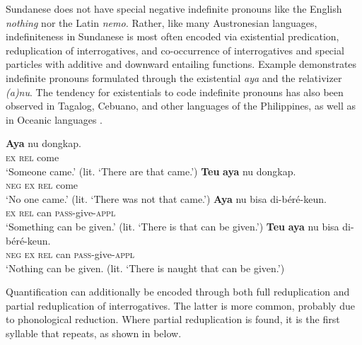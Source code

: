\documentclass[output=paper]{langscibook}
\begin{document}
Sundanese does not have special negative indefinite pronouns like the English \textit{nothing} nor the Latin \textit{nemo.} Rather, like many Austronesian languages, indefiniteness in Sundanese is most often encoded via existential predication, reduplication of interrogatives, and co-occurrence of interrogatives and special particles with additive and downward entailing functions. Example  demonstrates indefinite pronouns formulated through the existential \textit{aya} and the relativizer \textit{(a)nu}. The tendency for existentials to code indefinite pronouns has also been observed in Tagalog, Cebuano, and other languages of the Philippines, as well as in Oceanic languages \citep{Haspelmath1997}. 

\ea\label{ex:sun:37}
    \ea\label{ex:sun:37a}
        \gll  \textbf{Aya} nu dongkap.\\ 
              \textsc{ex} \textsc{rel} come\\
        \glt ‘Someone came.’ (lit. ‘There are that came.’)
    \ex\label{ex:sun:37b}
        \gll  \textbf{Teu} \textbf{aya} nu dongkap.\\
              \textsc{neg} \textsc{ex} \textsc{rel} come\\
        \glt ‘No one came.’ (lit. ‘There was not that came.’) 
    \ex\label{ex:sun:37c}
        \gll  \textbf{Aya} nu bisa di-béré-keun. \\
               \textsc{ex} \textsc{rel} can \textsc{pass}{}-give{}-\textsc{appl}\\
        \glt ‘Something can be given.’ (lit. ‘There is that can be given.’)
    \ex\label{ex:sun:37d}
        \gll  \textbf{Teu} \textbf{aya} nu bisa di-béré-keun.\\
              \textsc{neg} \textsc{ex} \textsc{rel} can \textsc{pass}{}-give-\textsc{appl}\\
        \glt ‘Nothing can be given. (lit. ‘There is naught that can be given.’)
    \z
\z 

Quantification can additionally be encoded through both full reduplication and partial reduplication of interrogatives. The latter is more common, probably due to phonological reduction. Where partial reduplication is found, it is the first syllable that repeats, as shown in  below.
\end{document}
